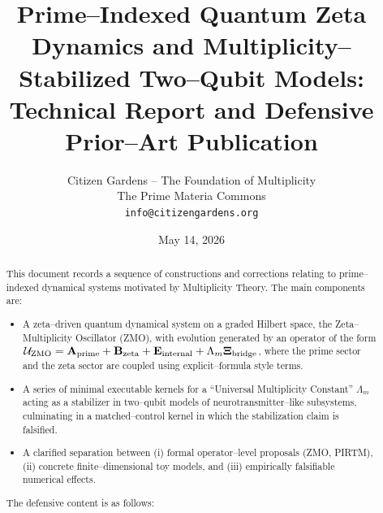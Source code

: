 \documentclass[11pt]{article}
\title{Prime–Indexed Quantum Zeta Dynamics and Multiplicity–Stabilized Two–Qubit Models:\\
Technical Report and Defensive Prior–Art Publication}
\author{Citizen Gardens -- The Foundation of Multiplicity\\
The Prime Materia Commons\\
\texttt{info@citizengardens.org}}
\date{May 14, 2026}
\begin{document}
\maketitle

\begin{abstract}

This document records a sequence of constructions and corrections relating to prime–indexed dynamical systems motivated by Multiplicity Theory. The main components are:

\begin{itemize}
  \item A zeta–driven quantum dynamical system on a graded Hilbert space, the Zeta–Multiplicity Oscillator (ZMO), with evolution generated by an operator of the form
  \(\mathcal{U}_{\rm ZMO} = \mathbf{A}_{\rm prime} + \mathbf{B}_{\rm zeta} + \mathbf{E}_{\rm internal} + \Lambda_m \mathbf{\Xi}_{\rm bridge}\),
  where the prime sector and the zeta sector are coupled using explicit–formula style terms.
  \item A series of minimal executable kernels for a ``Universal Multiplicity Constant'' \(\Lambda_m\) acting as a stabilizer in two–qubit models of neurotransmitter–like subsystems, culminating in a matched–control kernel in which the stabilization claim is falsified.
  \item A clarified separation between (i) formal operator–level proposals (ZMO, PIRTM), (ii) concrete finite–dimensional toy models, and (iii) empirically falsifiable numerical effects.
\end{itemize}

The defensive content is as follows:


\end{abstract}
\end{document}
